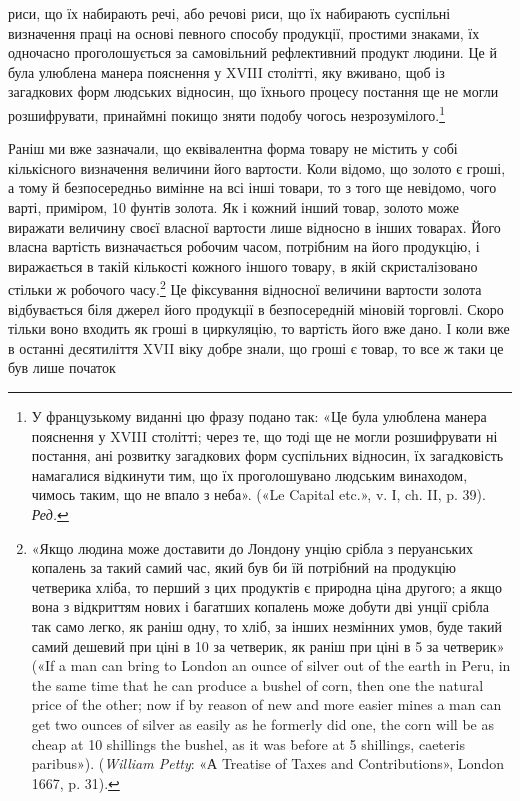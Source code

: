 риси, що їх набирають речі, або речові риси, що їх набирають
суспільні визначення праці на основі певного способу продукції,
простими знаками, їх одночасно проголошується за самовільний
рефлективний продукт людини. Це й була улюблена манера
пояснення у XVIII столітті, яку вживано, щоб із загадкових
форм людських відносин, що їхнього процесу постання ще не
могли розшифрувати, принаймні покищо зняти подобу чогось
незрозумілого.\footnote*{
У французькому виданні цю фразу подано так: «Це була улюблена
манера пояснення у XVIII столітті; через те, що тоді ще не могли розшифрувати
ні постання, ані розвитку загадкових форм суспільних відносин,
їх загадковість намагалися відкинути тим, що їх проголошувано
людським винаходом, чимось таким, що не впало з неба». («Le Capital
etc.», v. І, ch. II, p. 39). \emph{Ред.}
}

Раніш ми вже зазначали, що еквівалентна форма товару не
містить у собі кількісного визначення величини його вартости.
Коли відомо, що золото є гроші, а тому й безпосередньо вимінне
на всі інші товари, то з того ще невідомо, чого варті, приміром,
10 фунтів золота. Як і кожний інший товар, золото може виражати
величину своєї власної вартости лише відносно в інших товарах.
Його власна вартість визначається робочим часом, потрібним
на його продукцію, і виражається в такій кількості кожного
іншого товару, в якій скристалізовано стільки ж робочого часу.\footnote{
«Якщо людина може доставити до Лондону унцію срібла з перуанських
копалень за такий самий час, який був би їй потрібний на продукцію
четверика хліба, то перший з цих продуктів є природна ціна другого;
а якщо вона з відкриттям нових і багатших копалень може добути дві
унції срібла так само легко, як раніш одну, то хліб, за інших незмінних
умов, буде такий самий дешевий при ціні в 10 за четверик, як
раніш при ціні в 5 за четверик» («If a man can bring to London
an ounce of silver out of the earth in Peru, in the same time that he can
produce a bushel of corn, then one the natural price of the other; now if
by reason of new and more easier mines a man can get two ounces of silver
as easily as he formerly did one, the corn will be as cheap at 10 shillings
the bushel, as it was before at 5 shillings, caeteris paribus»). (\emph{William
Petty}: «А Treatise of Taxes and Contributions», London 1667, p. 31).
}
Це фіксування відносної величини вартости золота відбувається
біля джерел його продукції в безпосередній міновій торговлі.
Скоро тільки воно входить як гроші в циркуляцію, то вартість
його вже дано. І коли вже в останні десятиліття XVII віку
добре знали, що гроші є товар, то все ж таки це був лише початок
\parbreak{}  %
